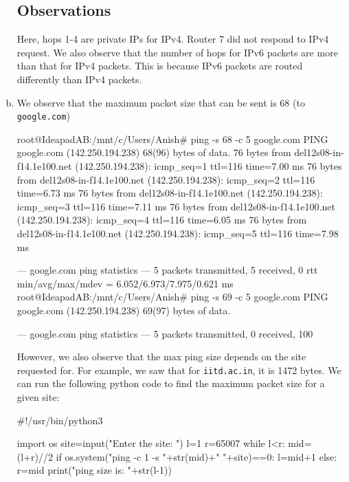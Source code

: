 \begin{enumerate}[a.]
    \subsection*{Observations}
    Here, hops 1-4 are private IPs for IPv4. Router 7 did not respond to IPv4 request. We also observe that the number of hops for IPv6 packets are more than that for IPv4 packets. This is because IPv6 packets are routed differently than IPv4 packets.

    \item We observe that the maximum packet size that can be sent is 68 (to {\tt google.com})
\begin{code}
root@IdeapadAB:/mnt/c/Users/Anish# ping -s 68 -c 5 google.com
PING google.com (142.250.194.238) 68(96) bytes of data.
76 bytes from del12s08-in-f14.1e100.net (142.250.194.238): icmp_seq=1 ttl=116 time=7.00 ms
76 bytes from del12s08-in-f14.1e100.net (142.250.194.238): icmp_seq=2 ttl=116 time=6.73 ms
76 bytes from del12s08-in-f14.1e100.net (142.250.194.238): icmp_seq=3 ttl=116 time=7.11 ms
76 bytes from del12s08-in-f14.1e100.net (142.250.194.238): icmp_seq=4 ttl=116 time=6.05 ms
76 bytes from del12s08-in-f14.1e100.net (142.250.194.238): icmp_seq=5 ttl=116 time=7.98 ms

--- google.com ping statistics ---
5 packets transmitted, 5 received, 0%
rtt min/avg/max/mdev = 6.052/6.973/7.975/0.621 ms
root@IdeapadAB:/mnt/c/Users/Anish# ping -s 69 -c 5 google.com
PING google.com (142.250.194.238) 69(97) bytes of data.

--- google.com ping statistics ---
5 packets transmitted, 0 received, 100%
\end{code}
However, we also observe that the max ping size depends on the site requested for. For example, we saw that for {\tt iitd.ac.in}, it is 1472 bytes.
We can run the following python code to find the maximum packet size for a given site:
\begin{code}
    #!/usr/bin/python3

    import os
    site=input("Enter the site: ")
    l=1
    r=65007
    while l<r:
        mid=(l+r)//2
        if os.system("ping -c 1 -s "+str(mid)+" "+site)==0:
            l=mid+1
        else:
            r=mid
    print("\n\nMax ping size is: "+str(l-1))
\end{code}
\end{enumerate}
